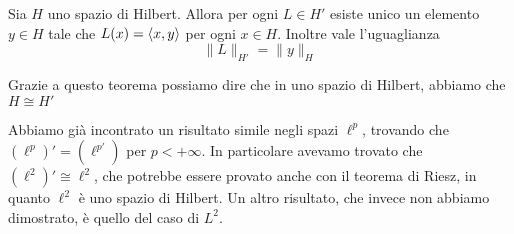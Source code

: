\begin{theorem}[di Riesz]\label{thm:riesz}
    Sia \(H\) uno spazio di Hilbert. Allora per ogni \(L \in H'\) esiste unico
    un elemento \(y \in H\) tale che \(L{(x)} = {\left\langle x, y\right\rangle} \) per ogni \(x \in
    H\). Inoltre vale l'uguaglianza
    \[
      \|L\|_{H'} = \|y\|_H
    \]
\end{theorem}
\begin{remark}
    Grazie a questo teorema possiamo dire che in uno spazio di Hilbert, abbiamo
    che \(H \cong H'\) 
\end{remark}
\begin{note}
    Abbiamo già incontrato un risultato simile negli spazi \(\ell^{p}\),
    trovando che \({(\ell^{p})}' = {(\ell^{p'})}\) per \(p < +\infty\). In
    particolare avevamo trovato che \({(\ell^2)}' \cong \ell^2\), che potrebbe essere
    provato anche con il teorema di Riesz, in quanto \(\ell^2\) è uno spazio di
    Hilbert. Un altro risultato, che invece non abbiamo dimostrato, è quello del caso 
    di \(L^2\).
\end{note}
